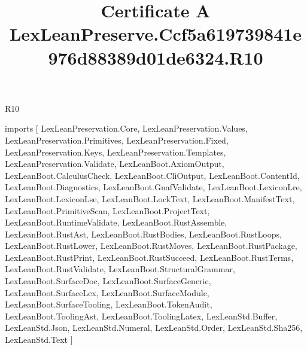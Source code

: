 \begin{lexlean}{R10}
\title{Certificate A LexLeanPreserve.Ccf5a619739841e976d88389d01de6324.R10}
\begin{coremodule}
imports [
  LexLeanPreservation.Core,
  LexLeanPreservation.Values,
  LexLeanPreservation.Primitives,
  LexLeanPreservation.Fixed,
  LexLeanPreservation.Keys,
  LexLeanPreservation.Templates,
  LexLeanPreservation.Validate,
  LexLeanBoot.AxiomOutput,
  LexLeanBoot.CalculusCheck,
  LexLeanBoot.CliOutput,
  LexLeanBoot.ContentId,
  LexLeanBoot.Diagnostics,
  LexLeanBoot.GnafValidate,
  LexLeanBoot.LexiconLre,
  LexLeanBoot.LexiconLse,
  LexLeanBoot.LockText,
  LexLeanBoot.ManifestText,
  LexLeanBoot.PrimitiveScan,
  LexLeanBoot.ProjectText,
  LexLeanBoot.RuntimeValidate,
  LexLeanBoot.RustAssemble,
  LexLeanBoot.RustAst,
  LexLeanBoot.RustBodies,
  LexLeanBoot.RustLoops,
  LexLeanBoot.RustLower,
  LexLeanBoot.RustMoves,
  LexLeanBoot.RustPackage,
  LexLeanBoot.RustPrint,
  LexLeanBoot.RustSucceed,
  LexLeanBoot.RustTerms,
  LexLeanBoot.RustValidate,
  LexLeanBoot.StructuralGrammar,
  LexLeanBoot.SurfaceDoc,
  LexLeanBoot.SurfaceGeneric,
  LexLeanBoot.SurfaceLex,
  LexLeanBoot.SurfaceModule,
  LexLeanBoot.SurfaceTooling,
  LexLeanBoot.TokenAudit,
  LexLeanBoot.ToolingAst,
  LexLeanBoot.ToolingLatex,
  LexLeanStd.Buffer,
  LexLeanStd.Json,
  LexLeanStd.Numeral,
  LexLeanStd.Order,
  LexLeanStd.Sha256,
  LexLeanStd.Text
]


\end{coremodule}
\end{lexlean}
